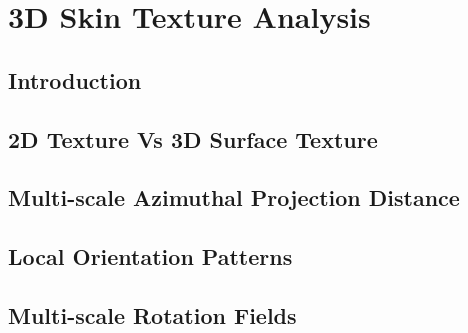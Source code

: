 
\chapter{3D Skin Texture Analysis} %

\label{Chapter2} %



\section{Introduction}

%


\section{2D Texture Vs 3D Surface Texture}


\section{Multi-scale Azimuthal Projection Distance}


\section{Local Orientation Patterns}


\section{Multi-scale Rotation Fields}